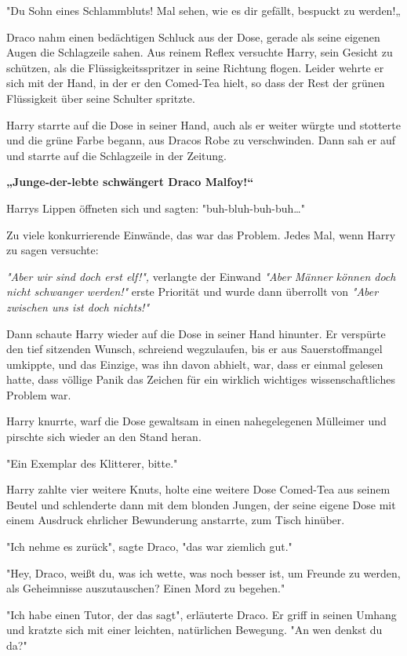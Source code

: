 {"Du Sohn eines Schlammbluts! Mal sehen, wie es dir gefällt, bespuckt zu werden!„

Draco nahm einen bedächtigen Schluck aus der Dose, gerade als seine eigenen Augen die Schlagzeile sahen. Aus reinem Reflex versuchte Harry, sein Gesicht zu schützen, als die Flüssigkeitsspritzer in seine Richtung flogen. Leider wehrte er sich mit der Hand, in der er den Comed-Tea hielt, so dass der Rest der grünen Flüssigkeit über seine Schulter spritzte.

Harry starrte auf die Dose in seiner Hand, auch als er weiter würgte und stotterte und die grüne Farbe begann, aus Dracos Robe zu verschwinden. Dann sah er auf und starrte auf die Schlagzeile in der Zeitung.

\textbf{„Junge-der-lebte schwängert Draco Malfoy!“}

Harrys Lippen öffneten sich und sagten: "buh-bluh-buh-buh…"

Zu viele konkurrierende Einwände, das war das Problem. Jedes Mal, wenn Harry zu sagen versuchte:

\emph{"Aber wir sind doch erst elf!",} verlangte der Einwand \emph{"Aber Männer können doch nicht schwanger werden!"} erste Priorität und wurde dann überrollt von \emph{"Aber zwischen uns ist doch nichts!"}

Dann schaute Harry wieder auf die Dose in seiner Hand hinunter. Er verspürte den tief sitzenden Wunsch, schreiend wegzulaufen, bis er aus Sauerstoffmangel umkippte, und das Einzige, was ihn davon abhielt, war, dass er einmal gelesen hatte, dass völlige Panik das Zeichen für ein wirklich wichtiges wissenschaftliches Problem war.

Harry knurrte, warf die Dose gewaltsam in einen nahegelegenen Mülleimer und pirschte sich wieder an den Stand heran.

"Ein Exemplar des Klitterer, bitte."

Harry zahlte vier weitere Knuts, holte eine weitere Dose Comed-Tea aus seinem Beutel und schlenderte dann mit dem blonden Jungen, der seine eigene Dose mit einem Ausdruck ehrlicher Bewunderung anstarrte, zum Tisch hinüber.

"Ich nehme es zurück", sagte Draco, "das war ziemlich gut."

"Hey, Draco, weißt du, was ich wette, was noch besser ist, um Freunde zu werden, als Geheimnisse auszutauschen? Einen Mord zu begehen."

"Ich habe einen Tutor, der das sagt", erläuterte Draco. Er griff in seinen Umhang und kratzte sich mit einer leichten, natürlichen Bewegung. "An wen denkst du da?"

}
